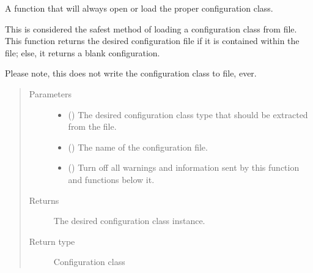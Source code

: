 \documentclass[letterpaper,10pt,english]{sphinxmanual}
\begin{document}
\begin{fulllineitems}
\label{\detokenize{python_docstrings/IfA_Smeargle.yankee.yankee_functions:IfA_Smeargle.yankee.yankee_functions.configuration_factory_function}}
A function that will always open or load the proper configuration
class.

This is considered the safest method of loading a configuration class
from file. This function returns the desired configuration file if it is
contained within the file; else, it returns a blank configuration.

Please note, this does not write the configuration class to file, ever.
\begin{quote}\begin{description}
\item[{Parameters}] \leavevmode\begin{itemize}
\item {} 
 () \textendash{} The desired configuration class type that should be extracted from the
file.

\item {} 
 (\sphinxstyleliteralemphasis{\sphinxupquote{ (}}\sphinxstyleliteralemphasis{\sphinxupquote{)}}) \textendash{} The name of the configuration file.

\item {} 
 (\sphinxstyleliteralemphasis{\sphinxupquote{ (}}\sphinxstyleliteralemphasis{\sphinxupquote{)}}) \textendash{} Turn off all warnings and information sent by this function and
functions below it.

\end{itemize}

\item[{Returns}] \leavevmode
{} \textendash{} The desired configuration class instance.

\item[{Return type}] \leavevmode
Configuration class

\end{description}\end{quote}

\end{fulllineitems}
\end{document}
